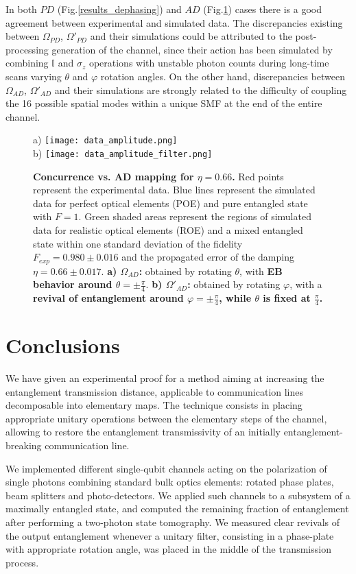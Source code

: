 \documentclass[aps,twocolumn,pra,superscriptaddress,showpacs,showkeys,floatfix]{revtex4-1}
\begin{document}
In both $PD$ (Fig.\ref{results_dephasing}) and $AD$ (Fig.\ref{results_amplitude}) cases there is a good agreement between experimental and simulated data. The discrepancies existing between $\Omega_{PD}$, $\Omega'_{PD}$ and their simulations could be attributed to the post-processing generation of the channel, since their action has been simulated by combining $\mathbb{I}$ and $\sigma_z$ operations with unstable photon counts during long-time scans varying $\theta$ and $\varphi$ rotation angles. On the other hand, discrepancies between $\Omega_{AD}$, $\Omega'_{AD}$ and their simulations are strongly related to the difficulty of coupling the 16 possible spatial modes within a unique SMF at the end of the entire channel.

\begin{figure}[h!]
	\centering
	a)	\texttt{[image: data\_amplitude.png]}\\
	b)	\texttt{[image: data\_amplitude\_filter.png]}
	\caption{\textbf{Concurrence vs. AD mapping for $\eta=0.66$.} Red points represent the experimental data. Blue lines represent the simulated data for perfect optical elements (POE) and pure entangled state with $F=1$. Green shaded areas represent the regions of simulated data for realistic optical elements (ROE) and a mixed entangled state within one standard deviation of the fidelity $F_{exp}=0.980\pm0.016$ and the propagated error of the damping $\eta=0.66\pm0.017$. \textbf{a) $\Omega_{AD}$:} obtained by rotating $\theta$, with \textbf{EB behavior around $\theta=\pm\frac{\pi}{4}$}. \textbf{b) $\Omega'_{AD}$:} obtained by rotating $\varphi$, with a \textbf{revival of entanglement around $\varphi=\pm\frac{\pi}{4}$, while $\theta$ is fixed at $\frac{\pi}{4}$.}}
	\label{results_amplitude}
\end{figure}

\section{Conclusions}

We have given an experimental proof for a method  aiming at increasing the entanglement transmission distance, applicable to communication lines decomposable into elementary maps. 
The technique consists in placing appropriate unitary operations between the elementary steps of the channel, allowing to restore the entanglement transmissivity of an initially entanglement-breaking communication line.

We implemented different single-qubit channels acting on the polarization of single photons combining standard bulk optics elements: rotated phase plates, beam splitters and photo-detectors. We applied such channels to a subsystem of a maximally entangled state, and computed the remaining fraction of entanglement after performing a two-photon state tomography. We measured clear revivals of the output entanglement whenever a unitary filter, consisting in a phase-plate with appropriate rotation angle, was placed in the middle of the transmission process. 
\end{document}
